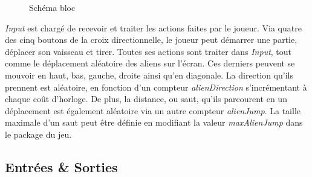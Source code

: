 \documentclass[french]{nakrule}
\begin{document}
\begin{figure}
\caption{Schéma bloc}
\label{inputBloc}
\end{figure}

\emph{Input} est chargé de recevoir et traiter les actions faites par le joueur.
Via quatre des cinq boutons de la croix directionnelle, le joueur peut démarrer
une partie, déplacer son vaisseau et tirer. Toutes ses actions sont traiter dans
\emph{Input}, tout comme le déplacement aléatoire des aliens sur l'écran. Ces
derniers peuvent se mouvoir en haut, bas, gauche, droite ainsi qu'en diagonale.
La direction qu'ils prennent est aléatoire, en fonction d'un compteur
\emph{alienDirection} s'incrémentant à chaque coût d'horloge. De plus, la
distance, ou saut, qu'ils parcourent en un déplacement est également aléatoire
via un autre compteur \emph{alienJump}. La taille maximale d'un saut peut être
définie en modifiant la valeur \emph{maxAlienJump} dans le package du jeu.



\subsection{Entrées \& Sorties}
\label{subsec:Entrees_Sorties_input}
\end{document}
